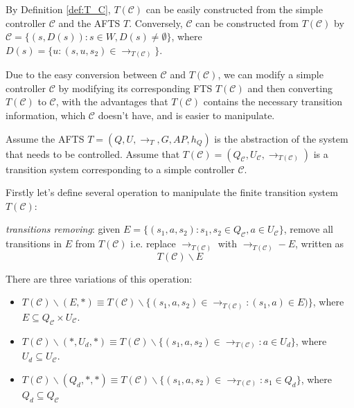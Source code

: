 \begin{remark}
	By Definition \ref{def:T_C}, $ T(\mathcal{C}) $ can be easily constructed from the simple controller $ \mathcal{C} $ and the AFTS $ T $. Conversely, $ \mathcal{C} $ can be constructed from $ T(\mathcal{C}) $ by $ \mathcal{C} = \{(s,D(s)):s\in W,D(s)\not=\emptyset\} $, where $ D(s)=\{u:(s,u,s_2)\in \rightarrow_{T(\mathcal{C})}\} $.
\end{remark}
Due to the easy conversion between  $ \mathcal{C} $ and $ T(\mathcal{C}) $, we can modify a simple controller $ \mathcal{C} $ by modifying its corresponding FTS $ T(\mathcal{C}) $ and then converting $ T(\mathcal{C}) $ to $ \mathcal{C} $, with the advantages that $ T(\mathcal{C}) $ contains the necessary transition information, which $ \mathcal{C} $ doesn't have, and is easier to manipulate. 

Assume the AFTS $ T = (Q,U,\rightarrow_T, G, AP, h_Q) $ is the abstraction of the system that needs to be controlled. Assume that $ T(\mathcal{C})=(Q_{\mathcal{C}}, U_{\mathcal{C}},\rightarrow_{T(\mathcal{C})})$ is a transition system corresponding to a simple controller $ \mathcal{C} $. 

Firstly let's define several operation to manipulate the finite transition system $ T(\mathcal{C}) $:

\emph{transitions removing}: given $ E = \{(s_1,a,s_2): s_1,s_2\in Q_{\mathcal{C}}, a\in U_{\mathcal{C}}\} $, remove all transitions in $ E $ from $ T(\mathcal{C}) $ i.e. replace $ \rightarrow_{T(\mathcal{C})} $ with $\rightarrow_{T(\mathcal{C})} - E$, written as 
\begin{displaymath}
	T(\mathcal{C})\backslash E 
\end{displaymath}

There are three variations of this operation:
\begin{itemize}
	\item $ T(\mathcal{C}) \backslash (E,*) \equiv T(\mathcal{C})\backslash \{(s_1,a,s_2)\in \rightarrow_{T(\mathcal{C})}: (s_1,a)\in E)\}$, where $ E \subseteq Q_{\mathcal{C}}\times U_{\mathcal{C}} $.
	\item $ T(\mathcal{C}) \backslash (*,U_d,*) \equiv T(\mathcal{C})\backslash \{(s_1,a,s_2)\in \rightarrow_{T(\mathcal{C})}: a\in U_d \}$, where $ U_d\subseteq U_{\mathcal{C}} $.
	\item $ T(\mathcal{C}) \backslash (Q_d,*,*)\equiv T(\mathcal{C})\backslash \{ (s_1,a,s_2)\in \rightarrow_{T(\mathcal{C})}: s_1\in Q_d \}$, where $ Q_d \subseteq Q_{\mathcal{C}} $ 
\end{itemize}

